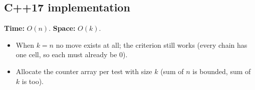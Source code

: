 \subsection*{C++17 implementation}

\begin{complexitybox}
\textbf{Time:} $O(n)$. \textbf{Space:} $O(k)$.
\end{complexitybox}

\begin{pitfallbox}
\begin{itemize}
  \item When $k=n$ no move exists at all; the criterion still works
        (every chain has one cell, so each must already be $0$).
  \item Allocate the counter array per test with size $k$ (sum of $n$ is
        bounded, sum of $k$ is too).
\end{itemize}
\end{pitfallbox}
